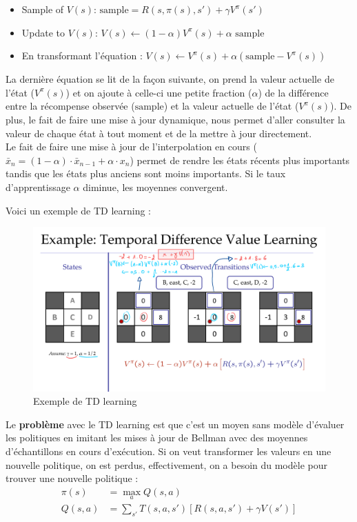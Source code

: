 \begin{itemize}[label=\textbullet]
    \item Sample of $V(s)$: $\text{sample}=R(s,\pi(s),s')+\gamma V^\pi(s')$
    \item Update to $V(s)$: $V(s)\leftarrow (1-\alpha)V^\pi(s)+\alpha\text{ sample}$
    \item En transformant l'équation : $V(s)\leftarrow V^\pi(s)+\alpha(\text{sample}-V^\pi(s))$
\end{itemize}
La dernière équation se lit de la façon suivante, on prend la valeur actuelle de l'état ($V^\pi(s)$) et on ajoute à celle-ci
une petite fraction ($\alpha$) de la différence entre la récompense observée ($\text{sample}$) et la valeur actuelle de l'état
($V^\pi(s)$). De plus, le fait de faire une mise à jour dynamique, nous permet d'aller consulter la valeur de chaque état à tout moment et de la mettre
à jour directement.\\
Le fait de faire une mise à jour de l'interpolation en cours ($\bar{x}_n=(1-\alpha)\cdot\bar{x}_{n-1}+\alpha\cdot x_n$) permet
de rendre les états récents plus importants tandis que les états plus anciens sont moins importants. Si le taux d'apprentissage
$\alpha$ diminue, les moyennes convergent.
\begin{example}
    Voici un exemple de TD learning :
    \begin{figure}[H]
        \centering
        \includegraphics[width=0.7\linewidth]{pictures/example_td_value_learning.pdf}
        \caption{Exemple de TD learning}
        \label{fig:td_learning}
    \end{figure}
\end{example}
Le \textbf{problème} avec le TD learning est que c'est un moyen sans modèle d'évaluer les politiques en imitant les mises à jour
de Bellman avec des moyennes d'échantillons en cours d'exécution. Si on veut transformer les valeurs en une nouvelle politique,
on est perdus, effectivement, on a besoin du modèle pour trouver une nouvelle politique :
\begin{equation*}
    \begin{aligned}
        \pi(s)&=\max\limits_{a} Q(s,a)\\
        Q(s,a)&=\sum_{s'}T(s,a,s')[R(s,a,s')+\gamma V(s')]
    \end{aligned}
\end{equation*}
